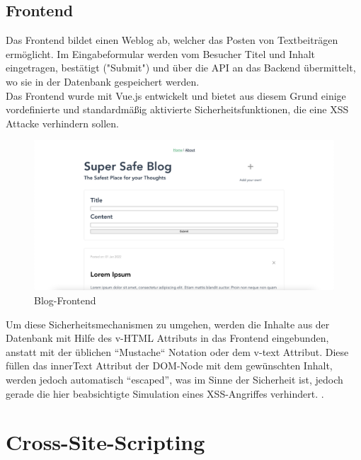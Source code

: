 \subsection{Frontend}
Das Frontend bildet einen Weblog ab, welcher das Posten von Textbeiträgen ermöglicht. Im Eingabeformular werden vom Besucher Titel und Inhalt eingetragen, bestätigt ("Submit") und über die API an das Backend übermittelt, wo sie in der Datenbank gespeichert werden.\\
Das Frontend wurde mit Vue.js entwickelt und bietet aus diesem Grund einige vordefinierte und standardmäßig aktivierte Sicherheitsfunktionen, die eine \ac{XSS}
 Attacke verhindern sollen. 
\begin{figure}
    \includegraphics[width=\linewidth]{img/blog.png}
    \caption{Blog-Frontend}
    \label{fig:frontend}
\end{figure}
Um diese Sicherheitsmechanismen zu umgehen, werden die Inhalte aus der Datenbank mit Hilfe des v-HTML Attributs in das Frontend eingebunden, anstatt mit der üblichen ``Mustache`` Notation oder dem v-text Attribut. Diese füllen das innerText Attribut der DOM-Node mit dem gewünschten Inhalt, werden jedoch automatisch ``escaped'', was im Sinne der Sicherheit ist, jedoch gerade die hier beabsichtigte Simulation eines XSS-Angriffes verhindert. . 

\section{Cross-Site-Scripting}

